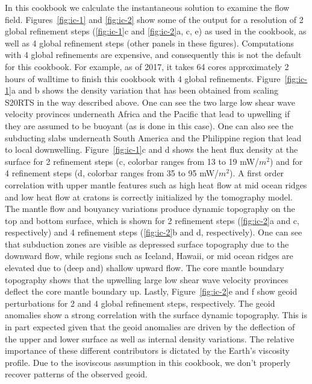 \documentclass{article}
\begin{document}
In this cookbook we calculate the instantaneous solution to examine the flow 
field. Figures~\ref{fig:ic-1} and \ref{fig:ic-2} show some of the output 
for a resolution of 2 global refinement steps (\ref{fig:ic-1}c and 
\ref{fig:ic-2}a, c, e) as used in the cookbook, as well as 4 global 
refinement steps (other panels in these figures). Computations with 4 global 
refinements are expensive, and consequently this is not the 
default for this cookbook. For example, as of 2017, it takes 64 cores approximately
2 hours of walltime to finish this cookbook with 4 global refinements. 
Figure~\ref{fig:ic-1}a and b shows the density variation 
that has been obtained from scaling S20RTS in the way described above.
One can see the two large low shear wave velocity provinces
underneath Africa and the Pacific that lead to upwelling if they are assumed to 
be buoyant (as is done in this case). One can also see the subducting slabs 
underneath South America and the Philippine region that lead to local downwelling. 
Figure~\ref{fig:ic-1}c and d shows the heat flux density at the surface for 
2 refinement steps (c, colorbar ranges from 13 to 19 mW/$m^2$) and for 
4 refinement steps (d, colorbar ranges from 35 to 95 mW/$m^2$). A first order correlation
with upper mantle features such as high heat flow at mid ocean ridges and low
heat flow at cratons is correctly initialized by the tomography model. 
The mantle flow and bouyancy variations produce dynamic topography on the 
top and bottom surface, which is shown for 2 refinement steps (\ref{fig:ic-2}a and c, respectively) 
and 4 refinement steps (\ref{fig:ic-2}b and d, respectively). 
One can see that subduction zones are visible as depressed surface topography 
due to the downward flow, while regions such as Iceland, Hawaii, or mid ocean 
ridges are elevated due to (deep and) shallow upward flow. The core mantle boundary
topography shows that the upwelling large low shear wave velocity 
provinces deflect the core mantle boundary up. Lastly, Figure~\ref{fig:ic-2}e and 
f show geoid perturbations for 2 and 4 global refinement steps, respectively. 
The geoid anomalies show a strong correlation with the surface dynamic topography. 
This is in part expected given that the geoid anomalies are driven by the 
deflection of the upper and lower surface
as well as internal density variations. The relative importance of these different
contributors is dictated by the Earth's viscosity profile. Due to the isoviscous
assumption in this cookbook, we don't properly recover patterns of the observed
geoid. 
\end{document}

